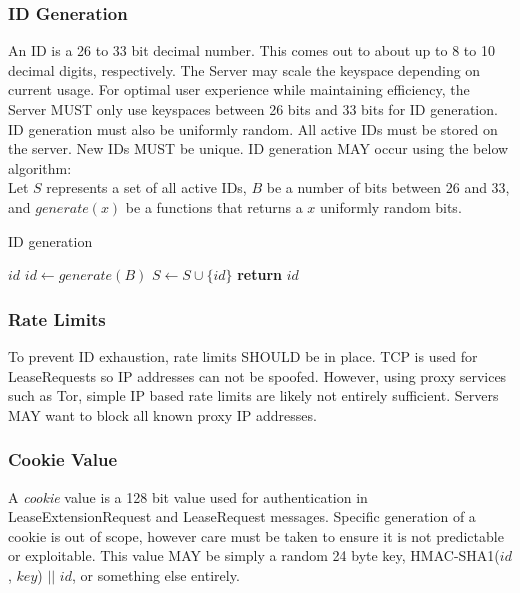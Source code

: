 \subsubsection{ID Generation}

An ID is a 26 to 33 bit decimal number. This comes out to about up to 8 to 10 decimal digits, respectively. The
Server may scale the keyspace depending on current usage. For optimal user experience while maintaining
efficiency, the Server MUST only use keyspaces between 26 bits and 33 bits for ID generation. ID generation must
also be uniformly random. All active IDs must be stored on the server. New IDs MUST be unique. ID generation MAY
occur using the below
algorithm:\\

Let $S$ represents a set of all active IDs, $B$ be a number of bits between 26 and 33, and $generate(x)$ be a
functions that returns a $x$ uniformly random bits.

\begin{algorithm}
    \caption{ID generation}
    \begin{algorithmic}
        \State $id$
        \Repeat
            \State $id\gets generate(B)$
        \State $S\gets S\cup \{id\}$
        \State \textbf{return} $id$
    \end{algorithmic}
\end{algorithm}

\subsubsection{Rate Limits}

To prevent ID exhaustion, rate limits SHOULD be in place. TCP is used for LeaseRequests so IP addresses
can not be spoofed. However, using proxy services such as Tor, simple IP based rate limits are likely not
entirely sufficient. Servers MAY want to block all known proxy IP addresses.

\subsubsection{Cookie Value}

A \emph{cookie} value is a 128 bit value used for authentication in LeaseExtensionRequest and
LeaseRequest messages. Specific generation of a cookie is out of scope, however care must be taken
to ensure it is not predictable or exploitable. This value MAY be simply a random 24 byte key, HMAC-SHA1($id$,
$key$) $||$ $id$, or something else entirely.

